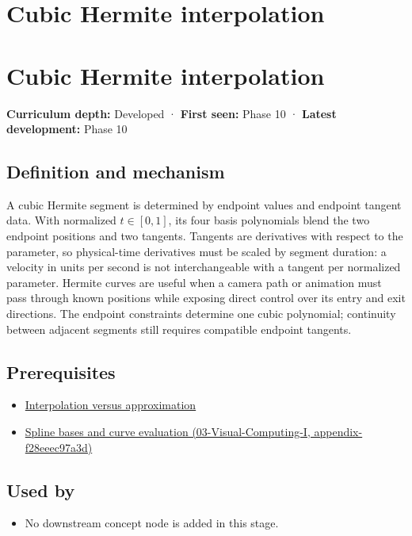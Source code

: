 \hypertarget{appendix-db3aef8f2fd6}{}
\section*{Cubic Hermite interpolation}
\section{Cubic Hermite interpolation}\label{cubic-hermite-interpolation}

\textbf{Curriculum depth:} Developed · \textbf{First seen:} Phase 10 · \textbf{Latest development:} Phase 10

\subsection{Definition and mechanism}\label{definition-and-mechanism}

A cubic Hermite segment is determined by endpoint values and endpoint tangent data. With normalized \(t\in[0,1]\), its four basis polynomials blend the two endpoint positions and two tangents. Tangents are derivatives with respect to the parameter, so physical-time derivatives must be scaled by segment duration: a velocity in units per second is not interchangeable with a tangent per normalized parameter. Hermite curves are useful when a camera path or animation must pass through known positions while exposing direct control over its entry and exit directions. The endpoint constraints determine one cubic polynomial; continuity between adjacent segments still requires compatible endpoint tangents.

\subsection{Prerequisites}\label{prerequisites}

\begin{itemize}
\tightlist
\item
  \hyperref[appendix-0c2a5f69851e]{Interpolation versus approximation}
\item
  \href{}{Spline bases and curve evaluation (03-Visual-Computing-I, appendix-f28eeec97a3d)}
\end{itemize}

\subsection{Used by}\label{used-by}

\begin{itemize}
\tightlist
\item
  No downstream concept node is added in this stage.
\end{itemize}

